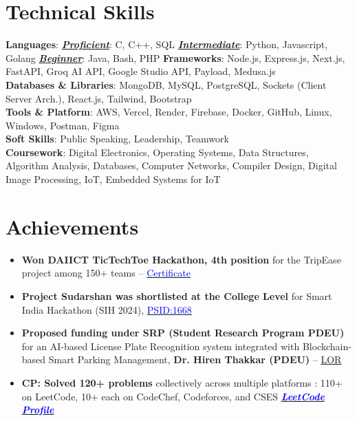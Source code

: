 \documentclass[letterpaper,11pt]{article}
\newcommand{\resumeItem}[1]{
  \item\small{
    {#1 \vspace{-2pt}}
  }
}
\newcommand{\resumeItemListStart}{\begin{itemize}}
\newcommand{\resumeItemListEnd}{\end{itemize}\vspace{-5pt}}
\begin{document}
\section{\textbf{Technical Skills}}
 \begin{itemize}[leftmargin=0.15in, label={}]
 \vspace{-3pt}
    \small{\item{
 \textbf{Languages}{: \textbf{\underline{\textit{Proficient}}}: C, C++, SQL \textbf{\underline{\textit{Intermediate}}}: Python, Javascript, Golang \textbf{\underline{\textit{Beginner}}}: Java, Bash, PHP}
     \vspace{0.5mm}
 \textbf{Frameworks}{:  Node.js, Express.js, Next.js, FastAPI, Groq AI API, Google Studio API, Payload, Medusa.js} \\
     \vspace{0.5mm}
      \textbf{Databases \& Libraries}{: MongoDB, MySQL, PostgreSQL, Sockets (Client Server Arch.), React.js, Tailwind, Bootstrap} \\
     \vspace{0.5mm}
     \textbf{Tools \& Platform}{: AWS, Vercel, Render, Firebase, Docker, GitHub, Linux, Windows, Postman, Figma} \\
         \textbf{Soft Skills}{: Public Speaking, Leadership, Teamwork} \\
     \textbf{Coursework}{: Digital Electronics, Operating Systems, Data Structures, Algorithm Analysis, Databases, Computer Networks, Compiler Design, Digital Image Processing, IoT, Embedded Systems for IoT} }}
 \end{itemize}
   \vspace{-19pt}

\section{\textbf{Achievements}}
\resumeItemListStart
\vspace{-3pt}
  \resumeItem{\textbf{Won DAIICT TicTechToe Hackathon, 4th position} for the TripEase project among 150+ teams – 
  \href{https://drive.usercontent.google.com/download?id=1b13F12dj3XKOmYaeIuE_BZfGoEfj6ogH&authuser=0}{\textcolor{blue}{Certificate}}}
  
  \resumeItem{\textbf{Project Sudarshan was shortlisted at the College Level} for Smart India Hackathon (SIH 2024), 
  \href{https://drive.usercontent.google.com/download?id=1wTAfgS5TMOPHQgIEbATFiR-whlNGGKKr&authuser=0}{\textcolor{blue}{PSID:1668}}}

  \resumeItem{\textbf{Proposed funding under SRP (Student Research Program PDEU)} for an AI-based License Plate Recognition system integrated with Blockchain-based Smart Parking Management, \textbf{Dr. Hiren Thakkar (PDEU)} -- {\textcolor{blue}{\href{LOR Link}{LOR}}}}

\resumeItem{\textbf{CP: Solved 120+ problems} collectively across multiple platforms : 110+ on LeetCode, 10+ each on CodeChef, Codeforces, and CSES}\href{https://leetcode.com/u/khero365/}{\textcolor{blue}{\textbf{\textit{LeetCode Profile}}}}


\resumeItemListEnd
  \vspace{-16pt}
\end{document}
